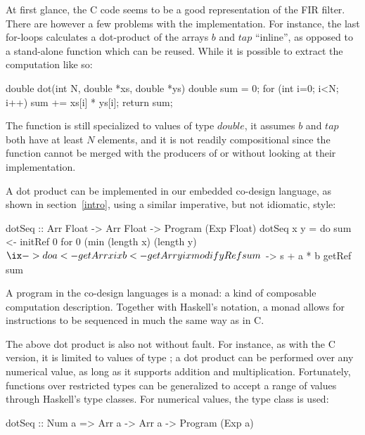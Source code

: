\documentclass[../paper.tex]{subfiles}
\begin{document}
At first glance, the C code seems to be a good representation of the FIR filter. There are however a few problems with the implementation. For instance, the last for-loops calculates a dot-product of the arrays $b$ and $tap$ ``inline'', as opposed to a stand-alone function which can be reused. While it is possible to extract the computation like so:


\begin{code}
double dot(int N, double *xs, double *ys) {
  double sum = 0;
  for (int i=0; i<N; i++) sum += xs[i] * ys[i];
  return sum;
}
\end{code}

\noindent The function is still specialized to values of type $double$, it assumes $b$ and $tap$ both have at least $N$ elements, and it is not readily compositional since the function cannot be merged with the producers of  or  without looking at their implementation.

A dot product can be implemented in our embedded co-design language, as shown in section~\ref{intro}, using a similar imperative, but not idiomatic, style:

\begin{code}
dotSeq :: Arr Float -> Arr Float -> Program (Exp Float)
dotSeq x y = do
  sum <- initRef 0
  for 0 (min (length x) (length y) $ \ix -> do
    a <- getArr x ix
    b <- getArr y ix
    modifyRef sum $ \s -> s + a * b
  getRef sum
\end{code}

\noindent A program in the co-design languages is a monad: a kind of composable computation description. Together with Haskell's  notation, a monad allows for instructions to be sequenced in much the same way as in C.

The above dot product is also not without fault. For instance, as with the C version, it is limited to values of type ; a dot product can be performed over any numerical value, as long as it supports addition and multiplication. Fortunately, functions over restricted types can be generalized to accept a range of values through Haskell's type classes. For numerical values, the type class  is used:


\begin{code}
dotSeq :: Num a => Arr a -> Arr a -> Program (Exp a)
\end{code}
\end{document}
